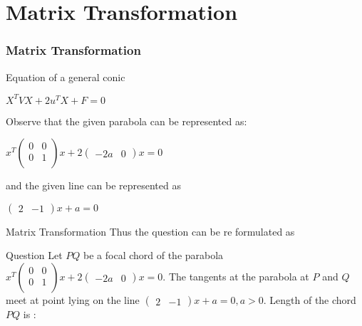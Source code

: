 \documentclass[12pt]{beamer}
\begin{document}
\section{Matrix Transformation}
\begin{frame}
  \frametitle{Matrix Transformation}

  \begin{block}{Equation of a general conic}
    \begin{center}
        $X^TVX + 2u^TX + F = 0$
    \end{center}
  \end{block}
    \begin{block}{Observe that the given parabola can be represented as:}
    \begin{center}
       $ x^T \left( {\begin{array}{cc} 0 & 0 \\ 0 & 1 \\ \end{array}} \right) x + 2 \left({\begin{array}{cc}-2a &  0\end{array}}\right)x = 0$
    \end{center}

    \end{block}  
    \begin{block}{and the given line can be represented as}
    \begin{center}$\left( \begin{array}{cc} 2 &-1\end{array}\right)x + a = 0$\end{center}
    \end{block}  
    \end{frame}
    \begin{frame}{Matrix Transformation}
        Thus the question can be re formulated as
        \begin{block}{Question}
        Let $PQ$ be a focal chord of the parabola $ x^T \left( {\begin{array}{cc} 0 & 0 \\ 0 & 1 \\ \end{array}} \right) x + 2 \left({\begin{array}{cc}-2a &  0\end{array}}\right)x = 0$. The tangents at the parabola at $P$ and $Q$ meet at point lying on the line $\left( \begin{array}{cc} 2 &-1\end{array}\right)x + a = 0, a>0$. Length of the chord $PQ$ is : 
        \end{block}
    \end{frame}
\end{document}

